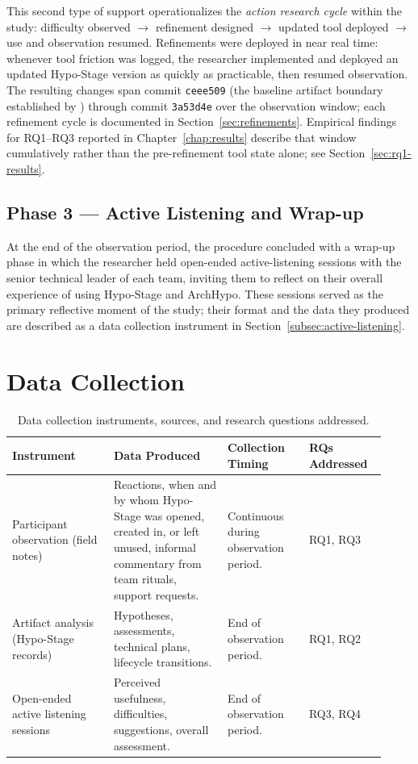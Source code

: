 This second type of support operationalizes the \emph{action research cycle} within
the study: difficulty observed $\rightarrow$ refinement designed $\rightarrow$
updated tool deployed $\rightarrow$ use and observation resumed. Refinements were
deployed in near real time: whenever tool friction was logged, the researcher
implemented and deployed an updated Hypo-Stage version as quickly as practicable,
then resumed observation. The resulting changes span commit \texttt{ceee509}
(the baseline artifact boundary established by \citealt{correa2025}) through
commit \texttt{3a53d4e} over the observation window; each refinement cycle is
documented in Section~\ref{sec:refinements}. Empirical findings for RQ1--RQ3
reported in Chapter~\ref{chap:results} describe that window cumulatively rather
than the pre-refinement tool state alone; see Section~\ref{sec:rq1-results}.

\subsection{Phase 3 --- Active Listening and Wrap-up}

At the end of the observation period, the procedure concluded with a wrap-up
phase in which the researcher held open-ended active-listening sessions with
the senior technical leader of each team, inviting them to reflect on their
overall experience of using Hypo-Stage and ArchHypo. These sessions served as
the primary reflective moment of the study; their format and the data they
produced are described as a data collection instrument in
Section~\ref{subsec:active-listening}.

\section{Data Collection}
\label{sec:data-collection}

\begin{table}[htbp]
\centering
\caption{Data collection instruments, sources, and research questions addressed.}
\label{tab:data-collection}
\begin{tabular}{p{0.25\linewidth} p{0.28\linewidth} p{0.20\linewidth} p{0.19\linewidth}}
\toprule
\textbf{Instrument} & \textbf{Data Produced} & \textbf{Collection Timing} & \textbf{RQs Addressed} \\
\midrule
Participant observation (field notes) & Reactions, when and by whom Hypo-Stage was opened, created in, or left unused, informal commentary from team rituals, support requests. & Continuous during observation period. & RQ1, RQ3 \\
\midrule
Artifact analysis (Hypo-Stage records) & Hypotheses, assessments, technical plans, lifecycle transitions. & End of observation period. & RQ1, RQ2 \\
\midrule
Open-ended active listening sessions & Perceived usefulness, difficulties, suggestions, overall assessment. & End of observation period. & RQ3, RQ4 \\
\bottomrule
\end{tabular}
\end{table}

